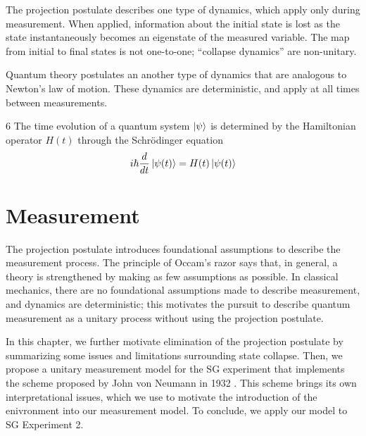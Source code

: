 The projection postulate describes one type of dynamics, which apply only during measurement. When applied, information about the initial state is lost as the state instantaneously becomes an eigenstate of the measured variable. The map from initial to final states is not one-to-one; ``collapse dynamics'' are non-unitary.

Quantum theory postulates an another type of dynamics that are analogous to Newton's law of motion. These dynamics are deterministic, and apply at all times between measurements.

\begin{Thm:Postulate}{6}
  The time evolution of a quantum system $\ket{\psi}$ is determined by the Hamiltonian operator $H(t)$ through the Schrödinger equation
  \begin{align}
    i\hbar \frac{d}{dt} \ket{\psi(t)} = H(t)\ket{\psi(t)}
  \end{align}
\end{Thm:Postulate}

\chapter{Measurement} \label{Chapter 4}

The projection postulate introduces foundational assumptions to describe the measurement process. The principle of Occam's razor says that, in general, a theory is strengthened by making as few assumptions as possible. In classical mechanics, there are no foundational assumptions made to describe measurement, and dynamics are deterministic; this motivates the pursuit to describe quantum measurement as a unitary process without using the projection postulate.

In this chapter, we further motivate elimination of the projection postulate by summarizing some issues and limitations surrounding state collapse. Then, we propose a unitary measurement model for the SG experiment that implements the scheme proposed by John von Neumann in 1932 \cite{Neumann}. This scheme brings its own interpretational issues, which we use to motivate the introduction of the enivronment into our measurement model. To conclude, we apply our model to SG Experiment 2.

